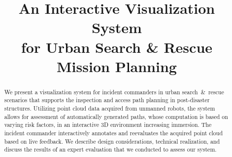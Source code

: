 \documentclass[conference,10pt,letter]{IEEEtran}
\begin{document}
\title{An Interactive Visualization System \\%
for Urban Search \& Rescue Mission Planning}

\author{
    \and
    \and
    \and
}


\maketitle


\begin{abstract}
We present a visualization system for incident commanders in urban search~\&~rescue scenarios that supports the inspection and access path planning in post-disaster structures. Utilizing point cloud data acquired from unmanned robots, the system allows for assessment of automatically generated paths, whose computation is based on varying risk factors, in an interactive 3D environment increasing immersion. The incident commander interactively annotates and reevaluates the acquired point cloud based on live feedback. We describe design considerations, technical realization, and discuss the results of an expert evaluation that we conducted to assess our system.
\end{abstract}
\end{document}

